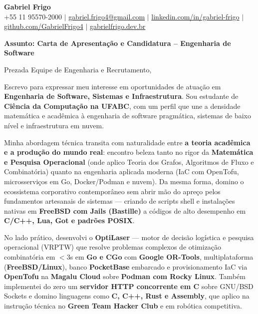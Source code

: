 \documentclass[letterpaper,10pt]{article}
\begin{document}
\begin{center}
  \textbf{\Huge Gabriel Frigo} \\ \vspace{4pt}
  \small +55 11 95570-2000 $|$ \href{mailto:gabriel.frigo4@gmail.com}{gabriel.frigo4@gmail.com} $|$
  \href{https://linkedin.com/in/gabriel-frigo-b6727b275/}{linkedin.com/in/gabriel-frigo} $|$
  \href{https://github.com/GabrielFrigo4}{github.com/GabrielFrigo4} $|$
  \href{https://gabrielfrigo.dev.br}{gabrielfrigo.dev.br}
\end{center}

\vspace{6pt}

\textbf{Assunto: Carta de Apresentação e Candidatura -- Engenharia de Software}

Prezada Equipe de Engenharia e Recrutamento,

Escrevo para expressar meu interesse em oportunidades de atuação em \textbf{Engenharia de Software, Sistemas e Infraestrutura}. Sou estudante de \textbf{Ciência da Computação na UFABC}, com um perfil que une a densidade matemática e acadêmica à engenharia de software pragmática, sistemas de baixo nível e infraestrutura em nuvem.

Minha abordagem técnica transita com naturalidade entre \textbf{a teoria acadêmica e a produção do mundo real}: encontro beleza tanto no rigor da \textbf{Matemática e Pesquisa Operacional} (onde aplico Teoria dos Grafos, Algoritmos de Fluxo e Combinatória) quanto na engenharia aplicada moderna (IaC com OpenTofu, microsserviços em Go, Docker/Podman e nuvem). Da mesma forma, domino o ecossistema corporativo contemporâneo sem abrir mão do apreço pelos fundamentos artesanais de sistemas — criando de scripts shell e instalações nativas em \textbf{FreeBSD com Jails (Bastille)} a códigos de alto desempenho em \textbf{C/C++, Lua, Got e padrões POSIX}.

No lado prático, desenvolvi o \textbf{OptiLaser} — motor de decisão logística e pesquisa operacional (VRPTW) que resolve problemas complexos de otimização combinatória em $<3$s em \textbf{Go e CGo} com \textbf{Google OR-Tools}, multiplataforma (\textbf{FreeBSD/Linux}), banco \textbf{PocketBase} embarcado e provisionamento IaC via \textbf{OpenTofu} na \textbf{Magalu Cloud} sobre \textbf{Podman com Rocky Linux}. Também implementei do zero um \textbf{servidor HTTP concorrente em C} sobre GNU/BSD Sockets e domino linguagens como \textbf{C, C++, Rust e Assembly}, que aplico na instrução técnica no \textbf{Green Team Hacker Club} e em robótica competitiva.
\end{document}
